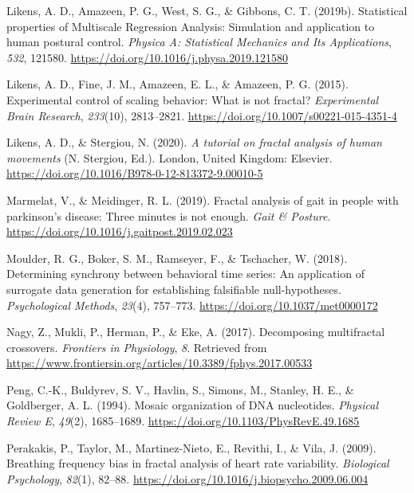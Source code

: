 \documentclass[
  man]{apa6}
\newlength{\cslhangindent}
\newlength{\cslentryspacingunit} %
\newenvironment{CSLReferences}[2] %
 {%
  \setlength{\parindent}{0pt}
  \ifodd #1
  \let\oldpar\par
  \def\par{\hangindent=\cslhangindent\oldpar}
  \fi
  \setlength{\parskip}{#2\cslentryspacingunit}
 }%
 {}
\begin{document}
\begin{CSLReferences}{1}{0}
\leavevmode{}%
Likens, A. D., Amazeen, P. G., West, S. G., \& Gibbons, C. T. (2019b). Statistical properties of Multiscale Regression Analysis: Simulation and application to human postural control. \emph{Physica A: Statistical Mechanics and Its Applications}, \emph{532}, 121580. \url{https://doi.org/10.1016/j.physa.2019.121580}

\leavevmode{}%
Likens, A. D., Fine, J. M., Amazeen, E. L., \& Amazeen, P. G. (2015). Experimental control of scaling behavior: What is not fractal? \emph{Experimental Brain Research}, \emph{233}(10), 2813--2821. \url{https://doi.org/10.1007/s00221-015-4351-4}

\leavevmode{}%
Likens, A. D., \& Stergiou, N. (2020). \emph{A tutorial on fractal analysis of human movements} (N. Stergiou, Ed.). London, United Kingdom: Elsevier. \url{https://doi.org/10.1016/B978-0-12-813372-9.00010-5}

\leavevmode{}%
Marmelat, V., \& Meidinger, R. L. (2019). Fractal analysis of gait in people with parkinson{'}s disease: Three minutes is not enough. \emph{Gait \& Posture}. \url{https://doi.org/10.1016/j.gaitpost.2019.02.023}

\leavevmode{}%
Moulder, R. G., Boker, S. M., Ramseyer, F., \& Tschacher, W. (2018). Determining synchrony between behavioral time series: An application of surrogate data generation for establishing falsifiable null-hypotheses. \emph{Psychological Methods}, \emph{23}(4), 757--773. \url{https://doi.org/10.1037/met0000172}

\leavevmode{}%
Nagy, Z., Mukli, P., Herman, P., \& Eke, A. (2017). Decomposing multifractal crossovers. \emph{Frontiers in Physiology}, \emph{8}. Retrieved from \url{https://www.frontiersin.org/articles/10.3389/fphys.2017.00533}

\leavevmode{}%
Peng, C.-K., Buldyrev, S. V., Havlin, S., Simons, M., Stanley, H. E., \& Goldberger, A. L. (1994). Mosaic organization of {DNA} nucleotides. \emph{Physical Review E}, \emph{49}(2), 1685--1689. \url{https://doi.org/10.1103/PhysRevE.49.1685}

\leavevmode{}%
Perakakis, P., Taylor, M., Martinez-Nieto, E., Revithi, I., \& Vila, J. (2009). Breathing frequency bias in fractal analysis of heart rate variability. \emph{Biological Psychology}, \emph{82}(1), 82--88. \url{https://doi.org/10.1016/j.biopsycho.2009.06.004}


\end{CSLReferences}
\end{document}
